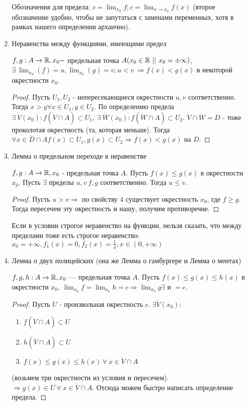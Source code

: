 \documentclass[12pt]{report}
\begin{document}
\begin{prop}
\begin{enumerate}
\begin{name}
Обозначения для предела: $c = \lim_{x_0}{f}; c = \lim_{x \to x_0}{f(x)}$ (второе обозначение удобно, чтобы не запутаться с заменами переменных, хотя в рамках нашего определения архаично).
\end{name}

\item Неравенства между функциями, имеющими предел

$f, g: A \to \mathbb{R}, x_0 - $ предельная точка $A (x_0 \in \mathbb{R} ~|| ~x_0 = \pm \infty)$, $\exists ~\lim_{x_0}(f) = u, \lim_{x_0}(g) = v, u < v ~\Rightarrow f(x) < g(x)$ в некоторой окрестности $x_0$.
\begin{proof}
Пусть $U_1, U_2$ - непересекающиеся окрестности $u, v$ соответственно. Тогда $x > y \forall x \in U_1, y \in U_2$. По определению предела $\exists ~\dot V(x_0): f(\dot V \cap A) \subset U_1, ~\exists ~\dot W(x_0): f(\dot W \cap A) \subset U_2$. $\dot V \cap \dot W = \dot D$ - тоже проколотая окрестность (та, которая меньше). Тогда $\forall x \in \dot D \cap A f(x) \subset U_1, g(x) \subset U_2 \Rightarrow f(x) < g(x)$ на $\dot D$.
\end{proof}

\item Лемма о предельном переходе в неравенстве

$f, g: A \to \mathbb{R}, x_0$ - предельная точка $A$. Пусть $f(x) \le g(x)$ в окрестности $x_0$. Пусть $\exists$ пределы $u, v ~f, g$ соответственно. Тогда $u \le v$.
\begin{proof}
Пусть $u > v \Rightarrow $ по свойству $4$ существует окрестность $x_0$, где $f \ge g$. Тогда пересечем эту окрестность и нашу, получим противоречие.
\end{proof}

\begin{note}
Если в условии строгое неравенство на функции, нельзя сказать, что между пределами тоже есть строгое неравенство:
$x_0 = +\infty, f_1(x) = 0, f_2(x) = \frac{1}{x}, x \in (0, +\infty)$
\end{note}

\item Лемма о двух полицейских (она же Лемма о гамбургере и Лемма о ментах)

$f, g, h: A \to \mathbb{R}, x_0$ --- предельная точка $A$. Пусть $f(x) \le g(x) \le h(x)$ в окрестности $x_0, ~\lim_{x_0}f = \lim_{x_0}h = c \Rightarrow \lim_{x_0}g \exists$ и $= c$.
\begin{proof}
Пусть $U$ - произвольная окрестность $c$. $\exists \dot V(x_0):$
\begin{enumerate}
\item $f(\dot V \cap A) \subset U$
\item $h(\dot V \cap A) \subset U$
\item $f(x) \le g(x) \le h(x) ~\forall ~x \in \dot V \cap A$
\end{enumerate}
(возьмем три окрестности из условия и пересечем). $\Rightarrow g(x) \in U ~\forall ~x \in \dot V \cap A$. Отсюда можем быстро написать определение предела.
\end{proof}


\end{enumerate}
\end{prop}
\end{document}
